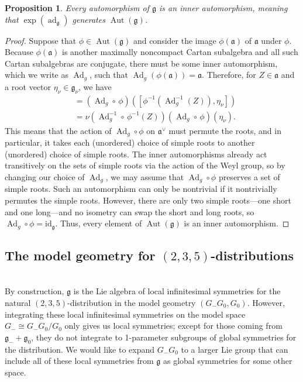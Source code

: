 \documentclass[12pt,a4paper]{amsart}
\newtheorem{proposition}[theorem]{Proposition}
\theoremstyle{definition}
\DeclareMathOperator{\ad}{ad}
\DeclareMathOperator{\Ad}{Ad}
\DeclareMathOperator{\Aut}{Aut}
\begin{document}
\begin{proposition}\label{innerauto} Every automorphism of $\mathfrak{g}$ is an inner automorphism, meaning that $\exp(\ad_\mathfrak{g})$ generates $\Aut(\mathfrak{g})$.\end{proposition}
\begin{proof}Suppose that $\phi\in\Aut(\mathfrak{g})$ and consider the image $\phi(\mathfrak{a})$ of $\mathfrak{a}$ under $\phi$. Because $\phi(\mathfrak{a})$ is another maximally noncompact Cartan subalgebra and all such Cartan subalgebras are conjugate, there must be some inner automorphism, which we write as $\Ad_g$, such that $\Ad_g(\phi(\mathfrak{a}))=\mathfrak{a}$. Therefore, for $Z\in\mathfrak{a}$ and a root vector $\eta_\nu\in\mathfrak{g}_\nu$, we have
\begin{align*}[Z,(\Ad_g\!\circ\,\phi)(\eta_\nu)] & =(\Ad_g\!\circ\,\phi)\left([\phi^{-1}(\Ad_g^{-1}(Z)),\eta_\nu]\right) \\ & =\nu\left(\Ad_g^{-1}\circ\,\phi^{-1}(Z)\right)(\Ad_g\circ\,\phi)(\eta_\nu).\end{align*}
This means that the action of $\Ad_g\!\circ\phi$ on $\mathfrak{a}^\vee$ must permute the roots, and in particular, it takes each (unordered) choice of simple roots to another (unordered) choice of simple roots. The inner automorphisms already act transitively on the sets of simple roots via the action of the Weyl group, so by changing our choice of $\Ad_g$, we may assume that $\Ad_g\circ\phi$ preserves a set of simple roots. Such an automorphism can only be nontrivial if it nontrivially permutes the simple roots. However, there are only two simple roots---one short and one long---and no isometry can swap the short and long roots, so $\Ad_g\circ\phi=\mathrm{id}_\mathfrak{g}$. Thus, every element of $\Aut(\mathfrak{g})$ is an inner automorphism.\mbox{\qedhere}\end{proof}

\subsection{The model geometry for \texorpdfstring{$(2,3,5)$}{(2,3,5)}-distributions}\hfill \\
By construction, $\mathfrak{g}$ is the Lie algebra of local infinitesimal symmetries for the natural $(2,3,5)$-distribution in the model geometry $(G_-G_0,G_0)$. However, integrating these local infinitesimal symmetries on the model space $G_-\cong G_-G_0/G_0$ only gives us local symmetries; except for those coming from $\mathfrak{g}_-+\mathfrak{g}_0$, they do not integrate to 1-parameter subgroups of global symmetries for the distribution. We would like to expand $G_-G_0$ to a larger Lie group that can include all of these local symmetries from $\mathfrak{g}$ as global symmetries for some other space.
\end{document}
